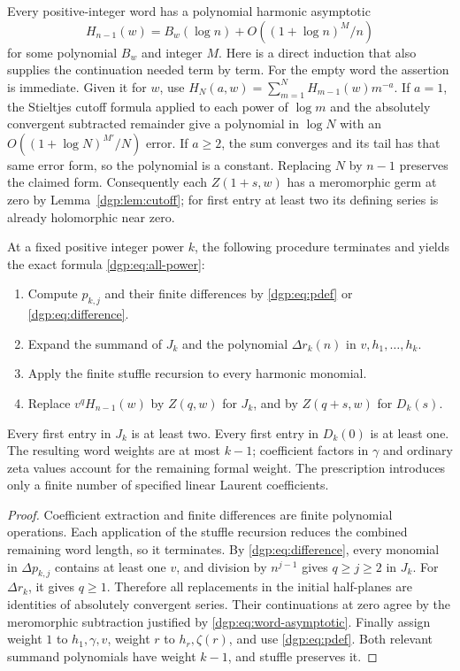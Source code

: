 Every positive-integer word has a polynomial harmonic asymptotic
\begin{equation}
 H_{n-1}(w)=B_w(\log n)+O((1+\log n)^M/n)
 \label{dgp:eq:word-asymptotic}
\end{equation}
for some polynomial $B_w$ and integer $M$.  Here is a direct induction
that also supplies the continuation needed term by term.  For the
empty word the assertion is immediate.  Given it for $w$, use
$H_N(a,w)=\sum_{m=1}^N H_{m-1}(w)m^{-a}$.  If $a=1$,
the Stieltjes cutoff formula applied to each power of $\log m$
and the absolutely convergent subtracted remainder give a
polynomial in $\log N$ with an
$O((1+\log N)^{M'}/N)$ error.  If $a\ge2$, the sum converges
and its tail has that same error form, so the polynomial is a
constant.  Replacing $N$ by $n-1$ preserves the claimed form.
Consequently each $Z(1+s,w)$ has a meromorphic germ at zero by
Lemma~\ref{dgp:lem:cutoff}; for first entry at least two its defining
series is already holomorphic near zero.

\begin{theorem}
\label{dgp:thm:algorithm}
At a fixed positive integer power $k$, the following procedure terminates
and yields the exact formula \eqref{dgp:eq:all-power}:
\begin{enumerate}
\item Compute $p_{k,j}$ and their finite differences by
\eqref{dgp:eq:pdef} or \eqref{dgp:eq:difference}.
\item Expand the summand of $J_k$ and the polynomial $\Delta r_k(n)$
in $v,h_1,\ldots,h_k$.
\item Apply the finite stuffle recursion to every harmonic monomial.
\item Replace $v^qH_{n-1}(w)$ by $Z(q,w)$ for $J_k$, and by
$Z(q+s,w)$ for $D_k(s)$.
\end{enumerate}
Every first entry in $J_k$ is at least two.  Every first entry in
$D_k(0)$ is at least one.  The resulting word weights are at most
$k-1$; coefficient factors in $\gamma$ and ordinary zeta values account
for the remaining formal weight.  The prescription introduces only a
finite number of specified linear Laurent coefficients.
\end{theorem}

\begin{proof}
Coefficient extraction and finite differences are finite polynomial
operations.  Each application of the stuffle recursion reduces the
combined remaining word length, so it terminates.  By
\eqref{dgp:eq:difference}, every monomial in $\Delta p_{k,j}$ contains
at least one $v$, and division by $n^{j-1}$ gives $q\ge j\ge2$
in $J_k$.  For $\Delta r_k$, it gives $q\ge1$.  Therefore all
replacements in the initial half-planes are identities of absolutely
convergent series.  Their continuations at zero agree by the
meromorphic subtraction justified by \eqref{dgp:eq:word-asymptotic}.
Finally assign weight $1$ to $h_1,\gamma,v$, weight $r$ to
$h_r,\zeta(r)$, and use \eqref{dgp:eq:pdef}.  Both relevant summand
polynomials have weight $k-1$, and stuffle preserves it.
\end{proof}

